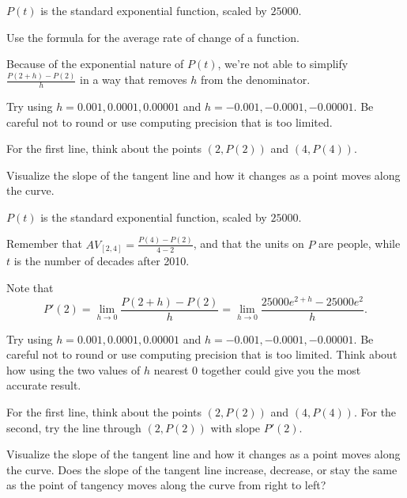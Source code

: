 \begin{smallhint}
\ba
	\item $P(t)$ is the standard exponential function, scaled by $25000$.
	\item Use the formula for the average rate of change of a function.
	\item Because of the exponential nature of $P(t)$, we're not able to simplify $\frac{P(2+h)-P(2)}{h}$ in a way that removes $h$ from the denominator.  
	\item Try using $h = 0.001, 0.0001, 0.00001$ and $h = -0.001, -0.0001, -0.00001$.  Be careful not to round or use computing precision that is too limited.  
	\item For the first line, think about the points $(2,P(2))$ and $(4,P(4))$.
	\item Visualize the slope of the tangent line and how it changes as a point moves along the curve.
\ea
\end{smallhint}
\begin{bighint}
\ba
	\item $P(t)$ is the standard exponential function, scaled by $25000$.
	\item Remember that $AV_{[2,4]} = \frac{P(4)-P(2)}{4-2}$, and that the units on $P$ are people, while $t$ is the number of decades after 2010. 
	\item Note that
	$$P'(2) = \lim_{h \to 0} \frac{P(2+h)-P(2)}{h} = \lim_{h \to 0} \frac{25000 e^{2+h}-25000e^2}{h}.$$  
	\item Try using $h = 0.001, 0.0001, 0.00001$ and $h = -0.001, -0.0001, -0.00001$.  Be careful not to round or use computing precision that is too limited.  Think about how using the two values of $h$ nearest 0 together could give you the most accurate result.
	\item For the first line, think about the points $(2,P(2))$ and $(4,P(4))$.  For the second, try the line through $(2,P(2))$ with slope $P'(2)$.
	\item Visualize the slope of the tangent line and how it changes as a point moves along the curve.  Does the slope of the tangent line increase, decrease, or stay the same as the point of tangency moves along the curve from right to left?
\ea
\end{bighint}
